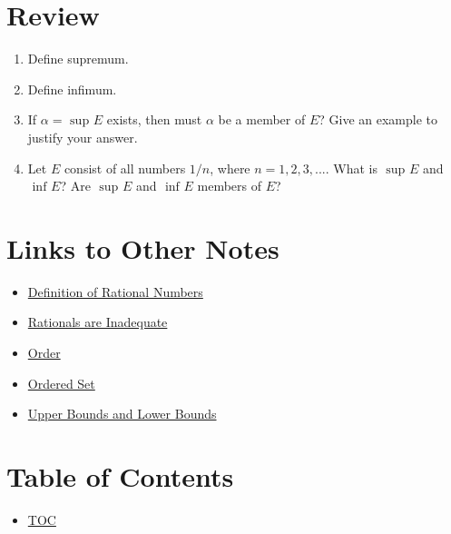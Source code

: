 \section*{Review}
\begin{enumerate}
  \item Define supremum.
  \item Define infimum.
  \item If $\alpha = \text{ sup } E$ exists, then must $\alpha$ be a member of $E$? Give an example to justify your answer.
  \item Let $E$ consist of all numbers $1/n$, where $n = 1, 2, 3, ...$. What is $\text{ sup } E$ and $\text{ inf } E$? Are $\text{ sup } E$ and $\text{ inf } E$ members of $E$?
\end{enumerate}


\section*{Links to Other Notes}
\begin{itemize}
  \item \hyperref[202501131947]{Definition of Rational Numbers}
  \item \hyperref[202501132004]{Rationals are Inadequate}
  \item \hyperref[202501141228]{Order}
  \item \hyperref[202501141241]{Ordered Set}
  \item \hyperref[202501141250]{Upper Bounds and Lower Bounds}
\end{itemize}

\section*{Table of Contents}

\begin{itemize}
  \item \hyperref[toc]{TOC}
\end{itemize}

